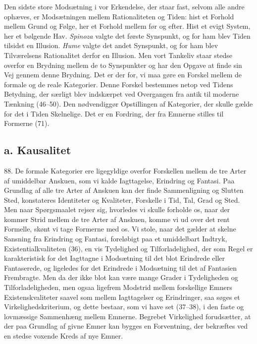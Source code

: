 \documentclass[12pt,a4paper]{book}
\newcommand{\opage}[1]{\marginnote{\footnotesize\textit{[#1]}}}
\begin{document}
Den sidste store Modsætning i vor Erkendelse, der staar fast, selvom alle andre
ophæves, er Modsætningen mellem Rationaliteten og Tiden: hist et Forhold mellem
Grund og Følge, her et Forhold mellem før og efter. Hist et evigt System, her et
bølgende Hav. \emph{Spinoza} valgte det første Synspunkt, og for ham blev Tiden
tilsidst en Illusion. \emph{Hume} valgte det andet Synspunkt, og for ham blev
Tilværelsens Rationalitet derfor en Illusion. Men vort Tankeliv staar stedse
overfor en Brydning mellem de to Synspunkter og har den Opgave at finde sin Vej
gennem denne Brydning. Det er der%
\opage{208}for, vi maa gøre en Forskel mellem de formale og
de reale Kategorier. Denne Forskel bestemmes netop ved Tidens Betydning, der
særligt blev indskærpet ved Overgangen fra antik til moderne Tænkning (46--50).
Den nødvendiggør Opstillingen af Kategorier, der skulle gælde for det i Tiden
Skelnelige. Det er en Fordring, der fra Emnerne stilles til Formerne (71).

\subsection*{a. Kausalitet}

88. De formale Kategorier ere ligegyldige overfor Forskellen mellem de tre Arter
af umiddelbar Anskuen, som vi kalde Iagttagelse, Erindring og Fantasi. Paa
Grundlag af alle tre Arter af Anskuen kan der finde Sammenligning og Slutten
Sted, konstateres Identiteter og Kvaliteter, Forskelle i Tid, Tal, Grad og Sted.
Men naar Spørgsmaalet rejser sig, hvorledes vi skulle forholde os, naar der
kommer Strid mellem de tre Arter af Anskuen, komme vi ud over det rent Formelle,
skønt vi tage Formerne med os. Vi stole, naar det gælder at skelne Sansning fra
Erindring og Fantasi, foreløbigt paa et umiddelbart Indtryk, Existentialkvaliteten
(36), en vis Tydelighed og Tilforladelighed, der som Regel er karakteristisk for
det Iagttagne i Modsætning til det blot Erindrede eller Fantaserede, og ligeledes
for det Erindrede i Modsætning til det af Fantasien Frembragte. Men da der ikke
blot kan være mange Grader i Tydeligheden og Tilforladeligheden, men ogsaa
ligefrem Modstrid mellem forskellige Emners Existenskvaliteter saavel som mellem
Iagttagelser og Erindringer, saa søges et Virkelighedskriterium, og dette
bestaar, som vi have set (37--38), i den faste og lovmæssige Sammenhæng mellem
Emnerne. Begrebet Virkelighed forudsætter, at der paa Grundlag af givne Emner kan
bygges en Forventning, der bekræftes ved en stedse voxende Kreds af nye Emner.
\end{document}
